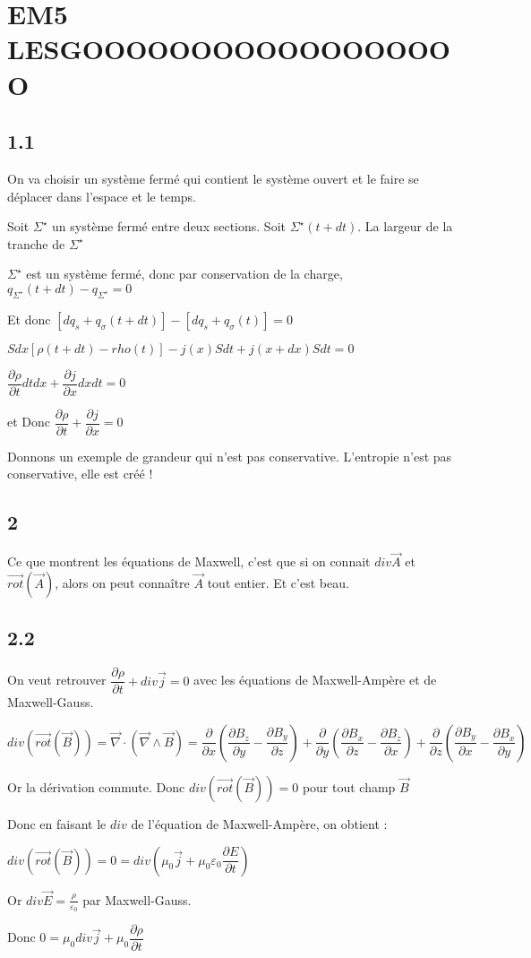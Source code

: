 \documentclass[a4paper,12pt]{book}
\begin{document}
\section{EM5 LESGOOOOOOOOOOOOOOOOOO}
\subsection{1.1}
On va choisir un système fermé qui contient le système ouvert et le faire se déplacer dans l'espace et le temps.
\par Soit $\Sigma^\star$ un système fermé entre deux sections. Soit $\Sigma^\star(t+dt)$. La largeur de la tranche de $\Sigma^\star$ \par $\Sigma^\star$ est un système fermé, donc par conservation de la charge, $q_{\Sigma^\star}(t+dt) - q_{\Sigma^\star}=0$ \par Et donc $[dq_s + q_\sigma(t+dt)]-[dq_s+q_\sigma(t)]=0$
\par $Sdx[\rho(t+dt)-rho(t)]-j(x)Sdt+j(x+dx)Sdt=0$ \par $\dfrac{\partial \rho}{\partial t}dtdx + \dfrac{\partial j}{\partial x}dxdt = 0$ \par et Donc $\dfrac{\partial\rho}{\partial t}+\dfrac{\partial j}{\partial x}=0$
\par Donnons un exemple de grandeur qui n'est pas conservative. L'entropie n'est pas conservative, elle est créé ! 

\subsection{2}
Ce que montrent les équations de Maxwell, c'est que si on connait $div\vec{A}$ et $\vec{rot}(\vec{A})$, alors on peut connaître $\vec{A}$ tout entier. Et c'est beau.

\subsection{2.2}
On veut retrouver $\dfrac{\partial\rho}{\partial t} + div\vec{j}=0$ avec les équations de Maxwell-Ampère et de Maxwell-Gauss. 
\par $div(\vec{rot}(\vec{B}))=\vec{\nabla}\cdot\left(\vec{\nabla}\wedge\vec{B}\right)= \dfrac{\partial }{\partial x}\left(\dfrac{\partial B_z}{\partial y} -\dfrac{\partial B_y}{\partial z}\right) +\dfrac{\partial }{\partial y}\left(\dfrac{\partial B_x}{\partial z} -\dfrac{\partial B_z}{\partial x}\right) + \dfrac{\partial }{\partial z}\left(\dfrac{\partial B_y}{\partial x} -\dfrac{\partial B_x}{\partial y}\right)$
\par Or la dérivation commute. Donc $div(\vec{rot}(\vec{B}))=0$ pour tout champ $\vec{B}$
\par Donc en faisant le $div$ de l'équation de Maxwell-Ampère, on obtient : \par $div(\vec{rot}(\vec{B}))=0 =div\left(\mu_0\vec{j}+\mu_0\varepsilon_0\dfrac{\partial E}{\partial t}\right)$
\par Or $div\vec{E} = \frac{\rho}{\varepsilon_0}$ par Maxwell-Gauss. \par Donc $0=\mu_0div\vec{j} + \mu_0\dfrac{\partial \rho}{\partial t}$
\end{document}

